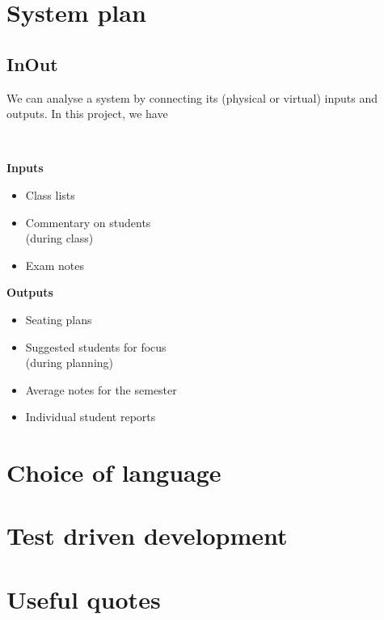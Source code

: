 \documentclass[10pt]{article}
\begin{document}
\section{System plan}

\subsection{InOut}

We can analyse a system by connecting its (physical or virtual) inputs and outputs. In this project, we have

\

\begin{minipage}[t]{0.45\textwidth}

\textbf{Inputs}

\begin{itemize}
\item Class lists
\item Commentary on students \\
(during class)
\item Exam notes
\end{itemize}


\end{minipage}
\hfill
\vline
\hfill
\begin{minipage}[t]{0.45\textwidth}

\textbf{Outputs}

\begin{itemize}
\item Seating plans
\item Suggested students for focus \\
(during planning)
\item Average notes for the semester
\item Individual student reports
\end{itemize}



\end{minipage}

\section{Choice of language}

\section{Test driven development}

\section{Useful quotes}
 
\end{document}
